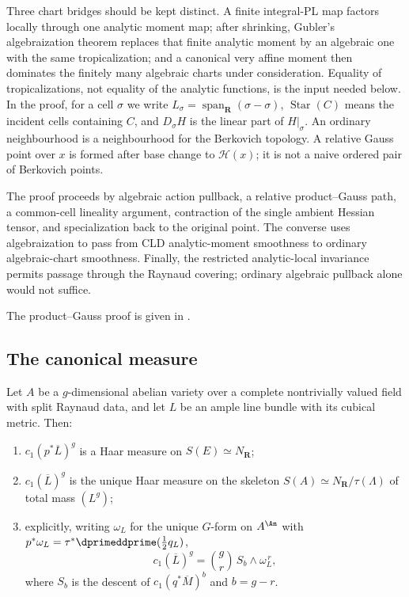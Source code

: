 Three chart bridges should be kept distinct.  A finite integral-PL map
factors locally through one analytic moment map; after shrinking, Gubler's
algebraization theorem replaces that finite analytic moment by an algebraic
one with the same tropicalization; and a canonical very affine moment then
dominates the finitely many algebraic charts under consideration.  Equality
of tropicalizations, not equality of the analytic functions, is the input
needed below.  In the proof, for a cell $\sigma$ we write
$L_\sigma=\operatorname{span}_{\mathbf R}(\sigma-\sigma)$,
$\operatorname{Star}(C)$ means the incident cells containing $C$, and
$D_\sigma H$ is the linear part of $H|_\sigma$.  An ordinary
neighbourhood is a neighbourhood for the Berkovich topology.  A relative
Gauss point over $x$ is formed after base change to $\mathcal H(x)$; it
is not a naive ordered pair of Berkovich points.

The proof proceeds by algebraic action pullback, a relative product--Gauss
path, a common-cell lineality argument, contraction of the single ambient
Hessian tensor, and specialization back to the original point.  The converse
uses algebraization to pass from CLD analytic-moment smoothness to ordinary
algebraic-chart smoothness.  Finally, the restricted analytic-local
invariance permits passage through the Raynaud covering; ordinary algebraic
pullback alone would not suffice.



The product--Gauss proof is given in .

\subsection{The canonical measure}
\label{sec:ch19-canonical-measure}

\begin{theorem}
\label{thm:ch19-canonical-ma}
Let $A$ be a $g$-dimensional abelian variety over a complete
nontrivially valued field with split Raynaud data, and let $L$ be an ample
line bundle with its cubical metric.  Then:
\begin{enumerate}
\item\label{itm:ch19-ma:E} $c_1(p^*\overline L)^g$ is a Haar measure on
 $S(E)\simeq N_{\mathbf R}$;
\item\label{itm:ch19-ma:A} $c_1(\overline L)^g$ is the unique Haar
 measure on the skeleton $S(A)\simeq N_{\mathbf R}/\tau(\Lambda)$ of total
 mass $(L^g)$;
\item\label{itm:ch19-ma:formula} explicitly, writing
 $\omega_L$ for the unique $G$-form on $A^{\An}$ with
 $p^*\omega_L=\tau^*\dprimeddprime(\tfrac12q_L)$,
 \[
   c_1(\overline L)^g=\binom{g}{r}\,S_b\wedge\omega_L^{\,r},
 \]
 where $S_b$ is the descent of $c_1(q^*\overline M)^b$ and
 $b=g-r$.
\end{enumerate}
\end{theorem}


